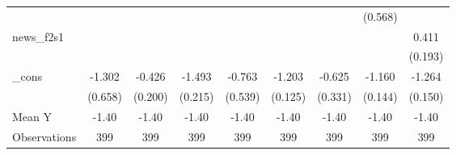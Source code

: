 {\begin{tabular}{l*{8}{c}}
            &                     &                     &                     &                     &                     &                     &     (0.568)         &                     \\
\addlinespace
news\_f2s1   &                     &                     &                     &                     &                     &                     &                     &       0.411\sym{**} \\
            &                     &                     &                     &                     &                     &                     &                     &     (0.193)         \\
\addlinespace
\_cons      &      -1.302\sym{*}  &      -0.426\sym{**} &      -1.493\sym{***}&      -0.763         &      -1.203\sym{***}&      -0.625\sym{*}  &      -1.160\sym{***}&      -1.264\sym{***}\\
            &     (0.658)         &     (0.200)         &     (0.215)         &     (0.539)         &     (0.125)         &     (0.331)         &     (0.144)         &     (0.150)         \\
\midrule
Mean Y      &       -1.40         &       -1.40         &       -1.40         &       -1.40         &       -1.40         &       -1.40         &       -1.40         &       -1.40         \\
Observations&         399         &         399         &         399         &         399         &         399         &         399         &         399         &         399         \\
\bottomrule
\end{tabular}
}
